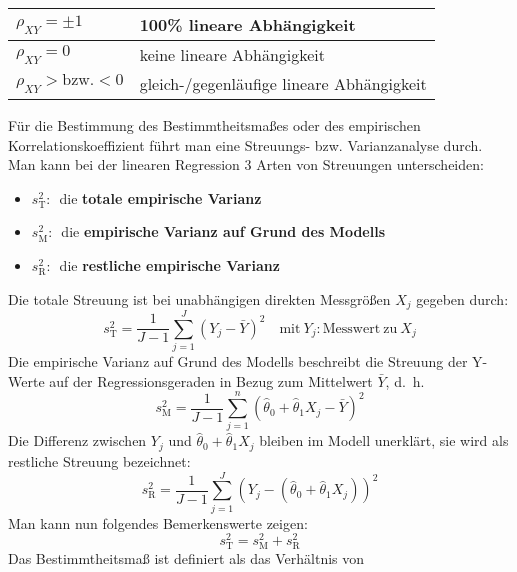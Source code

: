 \begin{center}
	\begin{tabular}
		{|p{100pt}|p{209pt}|} \hline
		$\rho_{XY} = \pm 1$&
		100{\%} lineare Abh\"{a}ngigkeit  \\
		\hline $\rho_{XY} = 0$&
		keine lineare Abh\"{a}ngigkeit \\
		\hline $\rho_{XY} > \mbox{bzw.} < 0$&
		gleich-/gegenl\"{a}ufige lineare Abh\"{a}ngigkeit \\
		\hline
	\end{tabular}
\end{center}

F\"{u}r die Bestimmung des Bestimmtheitsma{\ss}es oder des
empirischen Korrelationskoeffizient f\"{u}hrt man eine Streuungs-
bzw. Varianzanalyse durch. Man kann bei der linearen Regression 3
Arten von Streuungen unterscheiden:
\begin{itemize}
	\item[] $s_{\mathrm{T}}^2:$~die \textbf{totale empirische Varianz}
	\item[] $s_{\mathrm{M}}^2:$~die \textbf{empirische Varianz auf Grund des Modells}
	\item[] $s_{\mathrm{R}}^2:$~die \textbf{restliche empirische Varianz}
\end{itemize}
Die totale Streuung ist bei unabhängigen direkten Messgrößen $X_j$ gegeben
durch:
\begin{equation}
s_{\mathrm{T}}^2 = \frac{1}{J - 1}\sum\limits_{j = 1}^J {(Y_j - \bar {Y})^2}
\quad \mathrm{mit~} Y_j : \mathrm{Messwert ~zu~}  X_j
\end{equation}
Die empirische Varianz auf Grund des Modells beschreibt die
Streuung der Y-Werte auf der Regressionsgeraden in Bezug zum
Mittelwert $\bar{Y}$, d.~h.
\begin{equation}
s_{\mathrm{M}}^2 = \frac{1}{J - 1}\sum\limits_{j = 1}^n {(\hat{\theta}_0 + \hat{\theta}_1 X_j - \bar
	{Y})^2}
\end{equation}
Die Differenz zwischen $Y_j$ und $\hat{\theta}_0 + \hat{\theta}_1 X_j $ bleiben im
Modell unerkl\"{a}rt, sie wird als restliche Streuung bezeichnet:
\begin{equation}
s_{\mathrm{R}}^2 = \frac{1}{J - 1}\sum\limits_{j = 1}^J {(Y_j - (\hat{\theta}_0
	+ \hat{\theta}_1 X_j))^2}
\end{equation}
Man kann nun folgendes Bemerkenswerte zeigen:
\begin{equation}
s_{\mathrm{T}}^2 = s_{\mathrm{M}}^2 + s_{\mathrm{R}}^2
\end{equation}
Das Bestimmtheitsma{\ss} ist definiert als das Verh\"{a}ltnis von
